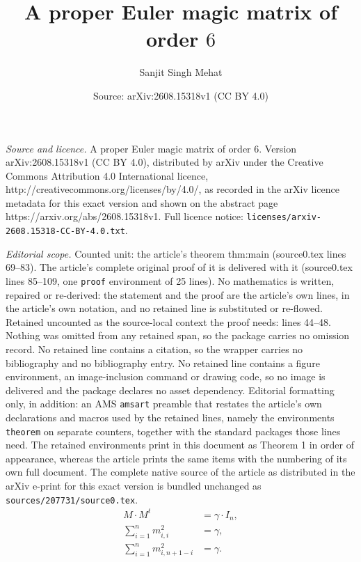 \documentclass[10pt,a4paper]{amsart}
\title{A proper Euler magic matrix of order $6$}
\author{Sanjit Singh Mehat}
\date{Source: arXiv:2608.15318v1 (CC BY 4.0)}
\begin{document}
\maketitle

\noindent\emph{Source and licence.} A proper Euler magic matrix of order $6$. Version arXiv:2608.15318v1 (CC BY 4.0), distributed by arXiv under the Creative Commons Attribution 4.0 International licence, http://creativecommons.org/licenses/by/4.0/, as recorded in the arXiv licence metadata for this exact version and shown on the abstract page https://arxiv.org/abs/2608.15318v1. Full licence notice: \texttt{licenses/arxiv-2608.15318-CC-BY-4.0.txt}.\par\smallskip

\noindent\textit{Editorial scope.} Counted unit: the article's theorem thm:main (source0.tex lines 69--83). The article's complete original proof of it is delivered with it (source0.tex lines 85--109, one \texttt{proof} environment of 25 lines). No mathematics is written, repaired or re-derived: the statement and the proof are the article's own lines, in the article's own notation, and no retained line is substituted or re-flowed.  Retained uncounted as the source-local context the proof needs: lines 44--48.  Nothing was omitted from any retained span, so the package carries no omission record.  No retained line contains a citation, so the wrapper carries no bibliography and no bibliography entry.  No retained line contains a figure environment, an image-inclusion command or drawing code, so no image is delivered and the package declares no asset dependency.  Editorial formatting only, in addition: an AMS \texttt{amsart} preamble that restates the article's own declarations and macros used by the retained lines, namely the environments \texttt{theorem} on separate counters, together with the standard packages those lines need.  The retained environments print in this document as Theorem 1 in order of appearance, whereas the article prints the same items with the numbering of its own full document.  The complete native source of the article as distributed in the arXiv e-print for this exact version is bundled unchanged as \texttt{sources/207731/source0.tex}.
\begin{align}
M\cdot M^{t} &= \gamma\cdot I_n, \label{eq:orth}\\
\textstyle\sum_{i=1}^{n} m_{i,i}^{2} &= \gamma, \label{eq:diag}\\
\textstyle\sum_{i=1}^{n} m_{i,n+1-i}^{2} &= \gamma. \label{eq:anti}
\end{align}
\end{document}

